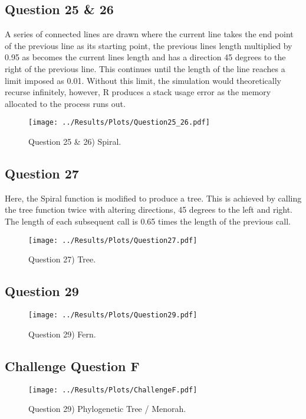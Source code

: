 \documentclass[12pt]{article}
\begin{document}
	\subsection{Question 25 \& 26}
	A series of connected lines are drawn where the current line takes the end point of the previous line as its starting point, the previous lines length multiplied by 0.95 as becomes the current lines length and has a direction 45 degrees to the right of the previous line. This continues until the length of the line reaches a limit imposed as 0.01. Without this limit, the simulation would theoretically recurse infinitely, however, R produces a stack usage error as the memory allocated to the process runs out.
	\begin{figure}[H]
		\centering
		\texttt{[image: ../Results/Plots/Question25\_26.pdf]}
		\caption{Question 25 \& 26) Spiral.}
	\end{figure}

	\subsection{Question 27}
	Here, the Spiral function is modified to produce a tree. This is achieved by calling the tree function twice with altering directions, 45 degrees to the left and right. The length of each subsequent call is 0.65 times the length of the previous call. 
	\begin{figure}[H]
		\centering
		\texttt{[image: ../Results/Plots/Question27.pdf]}
		\caption{Question 27) Tree.}
	\end{figure}

	\subsection{Question 29}
	\begin{figure}[H]
		\centering
		\texttt{[image: ../Results/Plots/Question29.pdf]}
		\caption{Question 29) Fern.}
	\end{figure}
	\subsection{Challenge Question F}
	\begin{figure}[H]
		\centering
		\texttt{[image: ../Results/Plots/ChallengeF.pdf]}
		\caption{Question 29) Phylogenetic Tree / Menorah.}
	\end{figure}
    
    
\end{document}

